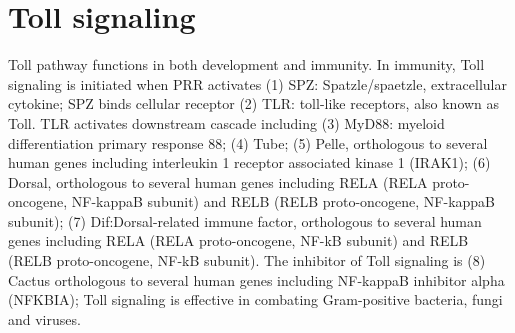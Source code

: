 \documentclass[11pt]{article}
\begin{document}
\begin{sloppypar}
\section{Toll signaling}
Toll pathway functions in both development and immunity. 
In immunity, Toll signaling is initiated when PRR activates 
\newline
(1) SPZ: Spatzle/spaetzle, extracellular cytokine; \newline
SPZ binds cellular receptor 
\newline
(2) TLR: toll-like receptors, also known as Toll. \newline 
TLR activates downstream cascade including 
\newline
(3) MyD88: myeloid differentiation primary response 88; \newline
(4) Tube; \newline
(5) Pelle, orthologous to several human genes including interleukin 1 receptor associated kinase 1 (IRAK1); \newline
(6) Dorsal, orthologous to several human genes including RELA (RELA proto-oncogene, NF-kappaB subunit) and RELB (RELB proto-oncogene, NF-kappaB subunit); \newline 
(7) Dif:Dorsal-related immune factor, orthologous to several human genes including RELA (RELA proto-oncogene, NF-kB subunit) and RELB (RELB proto-oncogene, NF-kB subunit). \newline
The inhibitor of Toll signaling is 
\newline
(8) Cactus orthologous to several human genes including NF-kappaB inhibitor alpha (NFKBIA); \newline
Toll signaling is effective in combating Gram-positive bacteria, fungi and viruses. 


\end{sloppypar}
\end{document}
